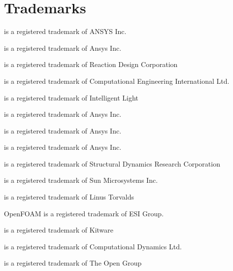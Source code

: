 
\section*{Trademarks}
 is a registered trademark of ANSYS Inc.\par
{} is a registered trademark of Ansys Inc.\par
{} is a registered trademark of Reaction Design Corporation\par
{} is a registered trademark of Computational Engineering International Ltd.\par
{} is a registered trademark of Intelligent Light\par
{} is a registered trademark of Ansys Inc.\par
{} is a registered trademark of Ansys Inc.\par
{} is a registered trademark of Ansys Inc.\par
{} is a registered trademark of Structural Dynamics Research Corporation\par
{} is a registered trademark of Sun Microsystems Inc.\par
{} is a registered trademark of Linus Torvalds\par
OpenFOAM is a registered trademark of ESI Group.\par
{} is a registered trademark of Kitware\par
{} is a registered trademark of Computational Dynamics Ltd.\par
{} is a registered trademark of The Open Group\par
